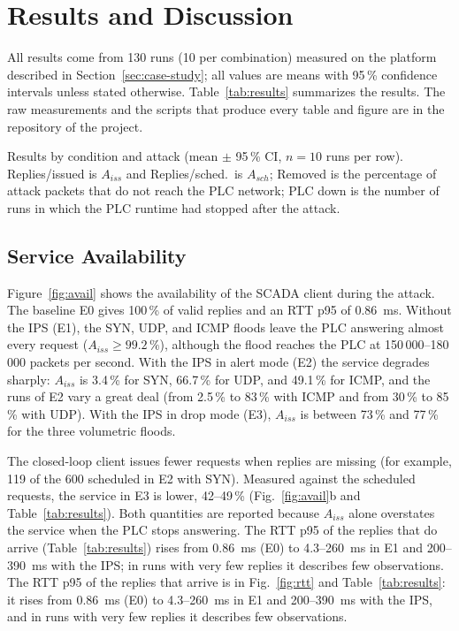 \section{Results and Discussion}\label{sec:results}
All results come from 130 runs (10 per combination) measured on the platform described in Section~\ref{sec:case-study}; all values are means with 95\,\% confidence intervals unless stated otherwise. Table~\ref{tab:results} summarizes the results. The raw measurements and the scripts that produce every table and figure are in the repository of the project.

\begin{table}[t]
\caption{Results by condition and attack (mean $\pm$ 95\,\% CI, $n=10$ runs per row). Replies/issued is $A_{iss}$ and Replies/sched.\ is $A_{sch}$; Removed is the percentage of attack packets that do not reach the PLC network; PLC down is the number of runs in which the PLC runtime had stopped after the attack.}\label{tab:results}
\centering\small
\begin{adjustbox}{max width=\textwidth}\end{adjustbox}
\end{table}

\subsection{Service Availability}
Figure~\ref{fig:avail} shows the availability of the SCADA client during the attack. The baseline E0 gives 100\,\% of valid replies and an RTT p95 of 0.86~ms. Without the IPS (E1), the SYN, UDP, and ICMP floods leave the PLC answering almost every request ($A_{iss}\geq 99.2\,\%$), although the flood reaches the PLC at 150\,000--180\,000 packets per second. With the IPS in alert mode (E2) the service degrades sharply: $A_{iss}$ is 3.4\,\% for SYN, 66.7\,\% for UDP, and 49.1\,\% for ICMP, and the runs of E2 vary a great deal (from 2.5\,\% to 83\,\% with ICMP and from 30\,\% to 85\,\% with UDP). With the IPS in drop mode (E3), $A_{iss}$ is between 73\,\% and 77\,\% for the three volumetric floods.

The closed-loop client issues fewer requests when replies are missing (for example, 119 of the 600 scheduled in E2 with SYN). Measured against the scheduled requests, the service in E3 is lower, 42--49\,\% (Fig.~\ref{fig:avail}b and Table~\ref{tab:results}). Both quantities are reported because $A_{iss}$ alone overstates the service when the PLC stops answering. The RTT p95 of the replies that do arrive (Table~\ref{tab:results}) rises from 0.86~ms (E0) to 4.3--260~ms in E1 and 200--390~ms with the IPS; in runs with very few replies it describes few observations. The RTT p95 of the replies that arrive is in Fig.~\ref{fig:rtt} and Table~\ref{tab:results}: it rises from 0.86~ms (E0) to 4.3--260~ms in E1 and 200--390~ms with the IPS, and in runs with very few replies it describes few observations.

